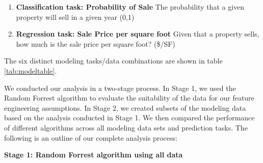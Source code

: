 \documentclass[12pt,]{article}
\providecommand{\tightlist}{%
  \setlength{\itemsep}{0pt}\setlength{\parskip}{0pt}}
\begin{document}
\begin{enumerate}
\def\labelenumi{\arabic{enumi})}
\tightlist
\item
  \textbf{Classification task: Probability of Sale} The probability that
  a given property will sell in a given year (0,1)
\item
  \textbf{Regression task: Sale Price per square foot} Given that a
  property sells, how much is the sale price per square foot? (\$/SF)
\end{enumerate}

\noindent The six distinct modeling tasks/data combinations are shown in
table \ref{tab:modeltable}.

\begin{table}

\caption{\label{tab:model table}\label{tab:modeltable} Six Predictive Models}
\centering
{}
\end{table}

We conducted our analysis in a two-stage process. In Stage 1, we used
the Random Forrest algorithm to evaluate the suitability of the data for
our feature engineering assumptions. In Stage 2, we created subsets of
the modeling data based on the analysis conducted in Stage 1. We then
compared the performance of different algorithms across all modeling
data sets and prediction tasks. The following is an outline of our
complete analysis process:\newline

\noindent \textbf{Stage 1: Random Forrest algorithm using all data}
\end{document}
